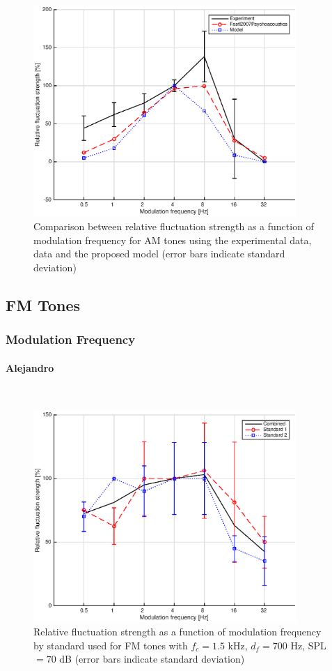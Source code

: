 \documentclass[a4paper]{article}
\begin{document}
\begin{figure}[H]
    \centering
    \includegraphics[height=8cm]{img/AM_tones-fm-results-Ryan-comparison}
    \caption{Comparison between relative fluctuation strength as a function of
        modulation frequency for AM tones using the experimental data,
        \citeauthor{Fastl2007Psychoacoustics} data and the proposed model
        (error bars indicate standard deviation)}
\end{figure}

\subsection{FM Tones}

\subsubsection{Modulation Frequency}

\paragraph{Alejandro} ~\\

\begin{figure}[H]
    \centering
    \includegraphics[height=8cm]{img/FM_tones-fm-results-AO-standards}
    \caption{Relative fluctuation strength as a function of modulation
        frequency by standard used for FM tones with $f_c = 1.5$ kHz,
        $d_f = 700$ Hz, SPL $= 70$ dB (error bars indicate standard deviation)}
\end{figure}
\end{document}
